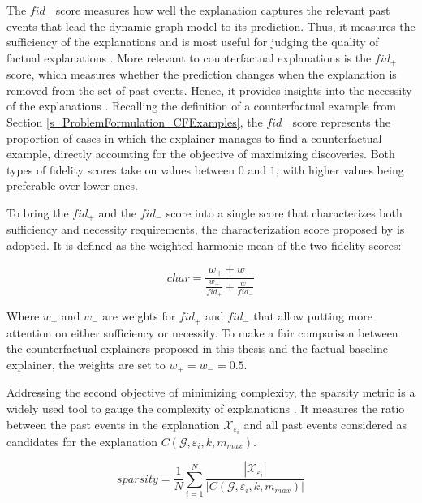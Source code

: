 The $fid_-$ score measures how well the explanation captures the relevant past events that lead the dynamic graph model to its prediction. Thus, it measures the sufficiency of the explanations and is most useful for judging the quality of factual explanations \cite{amara_graphframex_2022}. More relevant to counterfactual explanations is the $fid_+$ score, which measures whether the prediction changes when the explanation is removed from the set of past events. Hence, it provides insights into the necessity of the explanations \cite{amara_graphframex_2022}. Recalling the definition of a counterfactual example from Section \ref{s_ProblemFormulation_CFExamples}, the $fid_-$ score represents the proportion of cases in which the explainer manages to find a counterfactual example, directly accounting for the objective of maximizing discoveries. Both types of fidelity scores take on values between $0$ and $1$, with higher values being preferable over lower ones.

To bring the $fid_+$ and the $fid_-$ score into a single score that characterizes both sufficiency and necessity requirements, the characterization score proposed by \cite{amara_graphframex_2022} is adopted. It is defined as the weighted harmonic mean of the two fidelity scores:

\begin{equation}
    char = \frac{w_+ + w_-}{\frac{w_+}{fid_+} + \frac{w_-}{fid_-}}
\end{equation}

Where $w_+$ and $w_-$ are weights for $fid_+$ and $fid_-$ that allow putting more attention on either sufficiency or necessity. To make a fair comparison between the counterfactual explainers proposed in this thesis and the factual baseline explainer, the weights are set to $w_+ = w_- = 0.5$.

Addressing the second objective of minimizing complexity, the sparsity metric is a widely used tool to gauge the complexity of explanations \cite{yuan_explainability_2020, amara_graphframex_2022, prado-romero_survey_2023}. It measures the ratio between the past events in the explanation $\mathcal{X}_{\varepsilon_i}$ and all past events considered as candidates for the explanation $C(\mathcal{G}, \varepsilon_i, k, m_{max})$.

\begin{equation}
    sparsity = \frac{1}{N} \sum_{i = 1}^N \frac{|\mathcal{X}_{\varepsilon_i}|}{|C(\mathcal{G}, \varepsilon_i, k, m_{max})|}
\end{equation}

